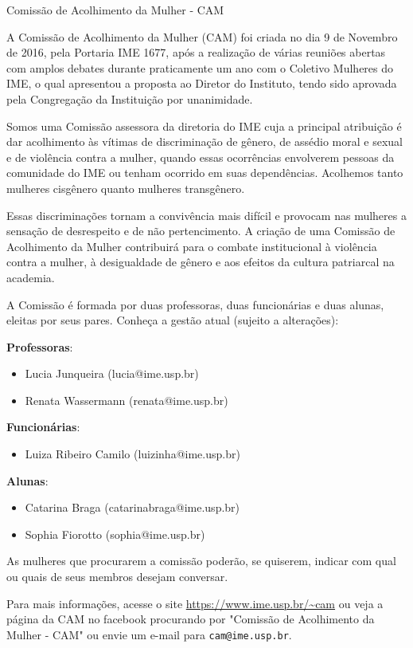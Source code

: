 \begin{subsecao}{Comissão de Acolhimento da Mulher - CAM}

A Comissão de Acolhimento da Mulher (CAM) foi criada no dia 9 de Novembro de 2016,
pela Portaria IME 1677, após a realização de várias reuniões abertas com amplos
debates durante praticamente um ano com o Coletivo Mulheres do IME, o qual 
apresentou a proposta ao Diretor do Instituto, tendo sido aprovada pela Congregação
da Instituição por unanimidade.

Somos uma Comissão assessora da diretoria do IME cuja a principal atribuição 
é dar acolhimento às vítimas de discriminação de gênero, de assédio moral e 
sexual e de violência contra a mulher, quando essas ocorrências envolverem 
pessoas da comunidade do IME ou tenham ocorrido em suas dependências. Acolhemos
tanto mulheres cisgênero quanto mulheres transgênero.

Essas discriminações tornam a convivência mais difícil e provocam nas mulheres
a sensação de desrespeito e de não pertencimento. A criação de uma Comissão de 
Acolhimento da Mulher contribuirá para o combate institucional à violência contra
a mulher, à desigualdade de gênero e aos efeitos da cultura patriarcal na academia.

A Comissão é formada por duas professoras, duas funcionárias e duas alunas, 
eleitas por seus pares. Conheça a gestão atual (sujeito a alterações): 
\pagebreak

\textbf{Professoras}: 
\begin{itemize}
  \item Lucia Junqueira (lucia@ime.usp.br)
  \item Renata Wassermann (renata@ime.usp.br)
\end{itemize}

\textbf{Funcionárias}: 
\begin{itemize}
  \item Luiza Ribeiro Camilo (luizinha@ime.usp.br)
\end{itemize}

\textbf{Alunas}: 
\begin{itemize}
  \item Catarina Braga (catarinabraga@ime.usp.br)
  \item Sophia Fiorotto (sophia@ime.usp.br)
\end{itemize}

As mulheres que procurarem a comissão poderão, se quiserem, indicar com qual ou 
quais de seus membros desejam conversar.

Para mais informações, acesse o site \url{https://www.ime.usp.br/~cam} ou veja
a página da CAM no facebook procurando por "Comissão de Acolhimento da Mulher - CAM" 
ou envie um e-mail para {\tt cam@ime.usp.br}. 


\end{subsecao}
